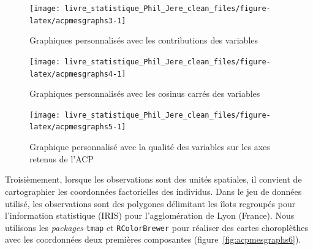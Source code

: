 \documentclass[
  11pt,
  french,
]{book}
\begin{document}
\begin{figure}

{\centering \texttt{[image: livre\_statistique\_Phil\_Jere\_clean\_files/figure-latex/acpmesgraphs3-1]} 

}

\caption{Graphiques personnalisés avec les contributions des variables}\label{fig:acpmesgraphs3}
\end{figure}

\begin{figure}

{\centering \texttt{[image: livre\_statistique\_Phil\_Jere\_clean\_files/figure-latex/acpmesgraphs4-1]} 

}

\caption{Graphiques personnalisés avec les cosinus carrés des variables}\label{fig:acpmesgraphs4}
\end{figure}

\begin{figure}

{\centering \texttt{[image: livre\_statistique\_Phil\_Jere\_clean\_files/figure-latex/acpmesgraphs5-1]} 

}

\caption{Graphique personnalisé avec la qualité des variables sur les axes retenus de l'ACP}\label{fig:acpmesgraphs5}
\end{figure}

Troisièmement, lorsque les observations sont des unités spatiales, il convient de cartographier les coordonnées factorielles des individus. Dans le jeu de données utilisé, les observations sont des polygones délimitant les îlots regroupés pour l'information statistique (IRIS) pour l'agglomération de Lyon (France). Nous utilisons les \emph{packages} \texttt{tmap} et \texttt{RColorBrewer} pour réaliser des cartes choroplèthes avec les coordonnées deux premières composantes (figure~\ref{fig:acpmesgraphs6}).
\end{document}
